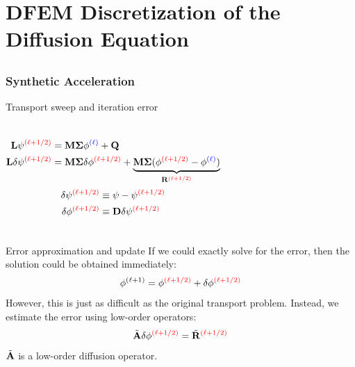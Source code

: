 \documentclass[compress,10pt]{beamer}
\newcommand{\tcr}[1]{\textcolor{red}{#1}}
\newcommand{\tcb}[1]{\textcolor{blue}{#1}}
\begin{document}
\section[MIP Form]{DFEM Discretization of the Diffusion Equation}
\subsection{}
\begin{frame}[t]\frametitle{Synthetic Acceleration}
\begin{block}{Transport sweep and iteration error}{\small
\begin{columns}
\begin{equation*}
\begin{aligned}
{\bf L} \psi^{\tcr{(\ell+1/2)}} &= {\bf M\Sigma} \phi^{\tcb{(\ell)}} +{\bf Q} \\ \vspace{1mm}
{\bf L} \delta \psi^{\tcr{(\ell+1/2)}} &= {\bf M\Sigma} \delta \phi^{\tcr{(\ell+1/2)}} + \underbrace{{\bf M\Sigma} (\phi^{\tcr{(\ell+1/2)}}-\phi^{\tcb{(\ell)}})}_{{\bf R}^{\tcr{(\ell+1/2)}}} 
\end{aligned}
\end{equation*}
\begin{equation*}
\begin{aligned}
\delta \psi^{\tcr{(\ell+1/2)}} &\equiv \psi - \psi^{\tcr{(\ell+1/2)}} \\
\delta \phi^{\tcr{(\ell+1/2)}} &\equiv {\bf D} \delta \psi^{\tcr{(\ell+1/2)}}
\end{aligned}
\end{equation*}
\end{columns}
}
\end{block}
\vspace{-1.5mm}
\begin{block}{Error approximation and update}{\small
If we could exactly solve for the error, then the solution could be obtained immediately:
\begin{equation*}
\phi^{(\ell+1)} = \phi^{\tcr{(\ell+1/2)}} + \delta \phi^{\tcr{(\ell+1/2)}}
\end{equation*}
However, this is just as difficult as the original transport problem. Instead, we estimate the error using low-order operators:
\begin{equation*}
\tilde{{\bf A}} \delta \phi^{\tcr{(\ell+1/2)}} = \tilde{{\bf R}}^{\tcr{(\ell+1/2)}}
\end{equation*}
$\tilde{{\bf A}}$ is a low-order diffusion operator.
}
\end{block}
\end{frame}
\end{document}
